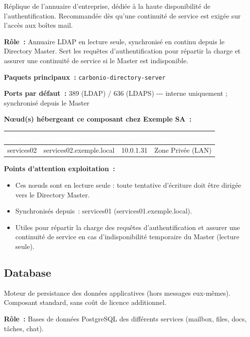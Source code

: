 \documentclass[11pt,a4paper]{report}
\newcommand{\tblhead}[1]{\textcolor{white}{\textbf{#1}}}
\begin{document}
Réplique de l'annuaire d'entreprise, dédiée à la haute disponibilité de l'authentification.\allowbreak{} Recommandée dès qu'une continuité de service est exigée sur l'accès aux boîtes mail.\allowbreak{}

\textbf{Rôle~:} Annuaire LDAP en lecture seule, synchronisé en continu depuis le Directory Master.\allowbreak{} Sert les requêtes d'authentification pour répartir la charge et assurer une continuité de service si le Master est indisponible.\allowbreak{}


\textbf{Paquets principaux~:} \texttt{carbonio-\allowbreak{}directory-\allowbreak{}server}

\textbf{Ports par défaut~:} 389 (LDAP) / 636 (LDAPS) -\allowbreak{}-\allowbreak{}-\allowbreak{} interne uniquement ; synchronisé depuis le Master

\textbf{Nœud(s) hébergeant ce composant chez Exemple SA~:}
\begin{longtable}{|p{3.2cm}|p{4.5cm}|p{3.2cm}|p{2.3cm}|}
\hline
\rowcolor{primary}\tblhead{Nœud} & \tblhead{Hostname} & \tblhead{IP} & \tblhead{Zone} \\
\hline
\endhead
services02 & services02.\allowbreak{}exemple.\allowbreak{}local & 10.\allowbreak{}0.\allowbreak{}1.\allowbreak{}31 & Zone Privée (LAN) \\
\hline
\end{longtable}

\textbf{Points d'attention exploitation~:}
\begin{itemize}[nosep]
  \item Ces nœuds sont en lecture seule : toute tentative d'écriture doit être dirigée vers le Directory Master.
  \item Synchronisés depuis~: services01 (services01.\allowbreak{}exemple.\allowbreak{}local).
  \item Utiles pour répartir la charge des requêtes d'authentification et assurer une continuité de service en cas d'indisponibilité temporaire du Master (lecture seule).
\end{itemize}

\subsection{Database}

Moteur de persistance des données applicatives (hors messages eux-\allowbreak{}mêmes).\allowbreak{} Composant standard, sans coût de licence additionnel.\allowbreak{}

\textbf{Rôle~:} Bases de données PostgreSQL des différents services (mailbox, files, docs, tâches, chat).\allowbreak{}
\end{document}
